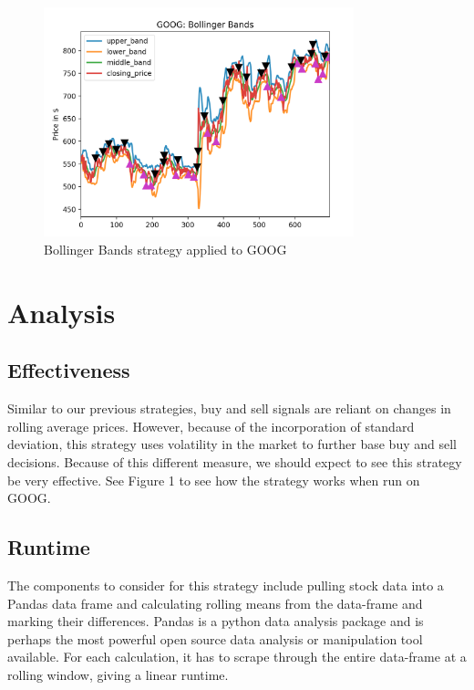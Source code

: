 \documentclass[letterpaper,11pt]{article}
\begin{document}
\begin{figure}[ht!]
\centering
\includegraphics[width=90mm]{Goog_Bbands.png}
\caption{Bollinger Bands strategy applied to GOOG  \label{overflow}}
\end{figure}

\section*{Analysis}

\subsection*{Effectiveness}
Similar to our previous strategies, buy and sell signals are reliant on changes in rolling average prices. However, because of the incorporation of standard deviation, this strategy uses volatility in the market to further base buy and sell decisions. Because of this different measure, we should expect to see this strategy be very effective. See Figure 1 to see how the strategy works when run on GOOG. 

\subsection*{Runtime}
The components to consider for this strategy include pulling stock data into a Pandas data frame and calculating rolling means from the data-frame and marking their differences. Pandas is a python data analysis package and is perhaps the most powerful open source data analysis or manipulation tool available. For each calculation, it has to scrape through the entire data-frame at a rolling window, giving a linear runtime.
\end{document}
